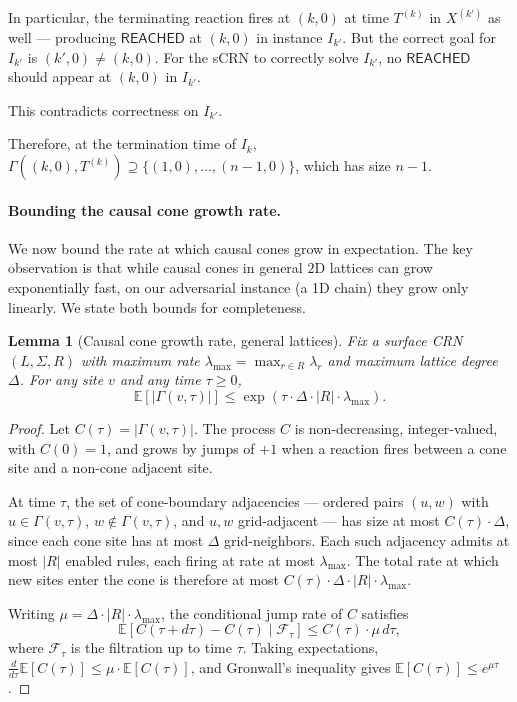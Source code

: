 \documentclass[11pt]{article}
\theoremstyle{plain}
\newtheorem{lemma}[theorem]{Lemma}
\theoremstyle{definition}
\theoremstyle{remark}
\begin{document}
In particular, the terminating reaction fires at $(k, 0)$ at time $T^{(k)}$ in $X^{(k')}$ as well --- producing $\mathsf{REACHED}$ at $(k, 0)$ in instance $I_{k'}$. But the correct goal for $I_{k'}$ is $(k', 0) \neq (k, 0)$. For the sCRN to correctly solve $I_{k'}$, no $\mathsf{REACHED}$ should appear at $(k, 0)$ in $I_{k'}$.

This contradicts correctness on $I_{k'}$.

Therefore, at the termination time of $I_k$, $\Gamma((k, 0), T^{(k)}) \supseteq \{(1, 0), \ldots, (n-1, 0)\}$, which has size $n - 1$.

\paragraph{Bounding the causal cone growth rate.}
We now bound the rate at which causal cones grow in expectation. The key observation is that while causal cones in general $2$D lattices can grow exponentially fast, on our adversarial instance (a 1D chain) they grow only linearly. We state both bounds for completeness.

\begin{lemma}[Causal cone growth rate, general lattices]
\label{lem:cone-growth-general}
Fix a surface CRN $(L, \Sigma, R)$ with maximum rate $\lambda_{\max} = \max_{r \in R} \lambda_r$ and maximum lattice degree $\Delta$. For any site $v$ and any time $\tau \geq 0$,
\[
\mathbb{E}[|\Gamma(v, \tau)|] \leq \exp(\tau \cdot \Delta \cdot |R| \cdot \lambda_{\max}).
\]
\end{lemma}

\begin{proof}
Let $C(\tau) = |\Gamma(v, \tau)|$. The process $C$ is non-decreasing, integer-valued, with $C(0) = 1$, and grows by jumps of $+1$ when a reaction fires between a cone site and a non-cone adjacent site.

At time $\tau$, the set of cone-boundary adjacencies --- ordered pairs $(u, w)$ with $u \in \Gamma(v, \tau)$, $w \notin \Gamma(v, \tau)$, and $u, w$ grid-adjacent --- has size at most $C(\tau) \cdot \Delta$, since each cone site has at most $\Delta$ grid-neighbors. Each such adjacency admits at most $|R|$ enabled rules, each firing at rate at most $\lambda_{\max}$. The total rate at which new sites enter the cone is therefore at most $C(\tau) \cdot \Delta \cdot |R| \cdot \lambda_{\max}$.

Writing $\mu = \Delta \cdot |R| \cdot \lambda_{\max}$, the conditional jump rate of $C$ satisfies
\[
\mathbb{E}[C(\tau + d\tau) - C(\tau) \mid \mathcal{F}_\tau] \leq C(\tau) \cdot \mu \, d\tau,
\]
where $\mathcal{F}_\tau$ is the filtration up to time $\tau$. Taking expectations, $\frac{d}{d\tau} \mathbb{E}[C(\tau)] \leq \mu \cdot \mathbb{E}[C(\tau)]$, and Gronwall's inequality gives $\mathbb{E}[C(\tau)] \leq e^{\mu \tau}$.
\end{proof}
\end{document}
